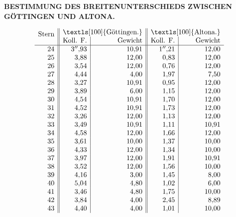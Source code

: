 \begingroup
\setlength{\abovedisplayskip}{7pt}
\setlength{\belowdisplayskip}{7pt}
\setlength{\abovedisplayshortskip}{3pt}
\setlength{\belowdisplayshortskip}{4pt}
\def\ixrad{\mathord{\vcenter{\hbox{\Large\(\surd\)}}}}
\def\ixangle#1#2#3{%
  \makebox[1.95em][r]{\(#1\)}%
  \makebox[1.45em][r]{\(#2\)}%
  \makebox[3.10em][r]{\(#3\)}}
\def\ixobsCount#1#2{\makebox[.8em][r]{#1}\enspace\makebox[2.6em][c]{#2}}
\def\ixobs#1#2#3#4#5#6#7#8#9{%
  #1 & \(\left\{\begin{array}{@{}l@{\enspace}l@{}}
  \text{Direkt}&\ixangle{#2}{#3}{#4}\\
  \text{Reflektiert}&\ixangle{#5}{#6}{#7}
  \end{array}\right.\) &
  \begin{tabular}{@{}l@{}}#8\\#9\end{tabular}}

\par\clearpage
\noindent{}\parbox[t]{\dimexpr\linewidth-24mm\relax}{\centering\scriptsize\bfseries BESTIMMUNG DES BREITENUNTERSCHIEDS ZWISCHEN GÖTTINGEN UND ALTONA.}\makebox[12mm][r]{}\par\medskip

{\small
\setlength{\arraycolsep}{.85em}
\[
\begin{array}{r||r|r||r|r}
\smash{\raisebox{-.7ex}{Stern}}&
\multicolumn{2}{c||}{\text{\normalsize\textls[100]{Göttingen.}}}&
\multicolumn{2}{c}{\text{\normalsize\textls[100]{Altona.}}}\\
&\text{Koll. F.}&\text{Gewicht}&\text{Koll. F.}&\text{Gewicht}\\
\hline
24&3''{,}93&10{,}91&1''{,}21&12{,}00\\
25&3{,}88&12{,}00&0{,}83&12{,}00\\
26&3{,}54&12{,}00&0{,}76&12{,}00\\
27&4{,}44&4{,}00&1{,}97&7{,}50\\
28&3{,}27&10{,}91&0{,}95&12{,}00\\
29&3{,}89&6{,}00&1{,}15&12{,}00\\
30&4{,}54&10{,}91&1{,}70&12{,}00\\
31&4{,}52&10{,}91&1{,}73&12{,}00\\
32&3{,}26&12{,}00&1{,}13&12{,}00\\
33&3{,}49&10{,}91&1{,}11&10{,}91\\
34&4{,}58&12{,}00&1{,}66&12{,}00\\
35&3{,}61&10{,}00&1{,}37&10{,}00\\
36&4{,}33&12{,}00&1{,}34&10{,}00\\
37&3{,}97&12{,}00&1{,}91&10{,}91\\
38&3{,}52&12{,}00&1{,}56&10{,}00\\
39&4{,}16&3{,}00&1{,}45&8{,}00\\
40&5{,}04&4{,}80&1{,}02&6{,}00\\
41&3{,}46&4{,}80&1{,}75&10{,}00\\
42&3{,}84&4{,}00&2{,}45&8{,}89\\
43&4{,}40&4{,}00&1{,}01&10{,}00
\end{array}
\]
\par
}

